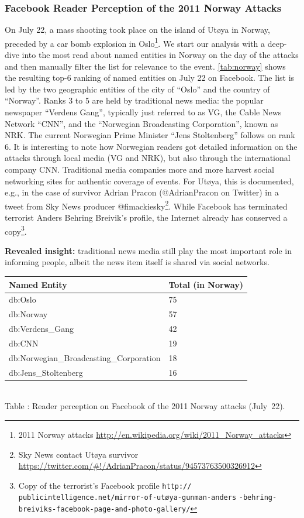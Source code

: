 \documentclass{iosart2c}
\newcommand{\tablecaption}[1]{%
  \\[1em]%
  \refstepcounter{table}%
  Table \arabic{table}: #1%
}
\begin{document}
\subsubsection{Facebook Reader Perception of the 2011 Norway Attacks}
On July 22, a mass shooting took place on the island of Utøya in Norway, preceded by a car bomb explosion in Oslo\footnote{2011 Norway attacks \url{http://en.wikipedia.org/wiki/2011_Norway_attacks}}.
We start our analysis with a deep-dive into the most read about named entities in Norway on the day of the attacks and then manually filter the list for relevance to the event.
\autoref{tab:norway} shows the resulting top-6 ranking of named entities on July 22 on Facebook.
The list is led by the two geographic entities of the city of ``Oslo'' and the country of ``Norway''.
Ranks 3 to 5 are held by traditional news media: the popular newspaper ``Verdens Gang'', typically just referred to as VG, the Cable News Network ``CNN'', and the ``Norwegian Broadcasting Corporation'', known as NRK.
The current Norwegian Prime Minister ``Jens Stoltenberg'' follows on rank 6.
It is interesting to note how Norwegian readers got detailed information on the attacks through local media (VG and NRK), but also through the international company CNN.
Traditional media companies more and more harvest social networking sites for authentic coverage of events.
For Utøya, this is documented, e.g., in the case of survivor Adrian Pracon (@AdrianPracon on Twitter) in a tweet from Sky News producer @fimackiesky\footnote{Sky News contact Utøya survivor \url{https://twitter.com/\#!/AdrianPracon/status/94573763500326912}}.
While Facebook has terminated terrorist Anders Behring Breivik's profile, the Internet already has conserved a copy\footnote{Copy of the terrorist's Facebook profile \scriptsize\texttt{http://} \texttt{publicintelligence.net/mirror-of-utøya-gunman-anders} \texttt{-behring-breiviks-facebook-page-and-photo-gallery/}}. 

\textbf{Revealed insight:}
traditional news media still play the most important role in informing people, albeit the news item itself is shared via social networks. 

\begin{table}
    \begin{tabular}{ | l | l |}
    \hline
	\textbf{Named Entity} & \textbf{Total (in Norway)}\\ \hline
	db:Oslo & 75\\
	db:Norway & 57\\
	db:Verdens\_Gang & 42\\
	db:CNN & 19\\
	db:Norwegian\_Broadcasting\_Corporation & 18\\
	db:Jens\_Stoltenberg & 16\\
    \hline
  \end{tabular}
  \tablecaption{Reader perception on Facebook of the 2011 Norway attacks (July~22).}
  \label{tab:norway}  
\end{table}
\end{document}
